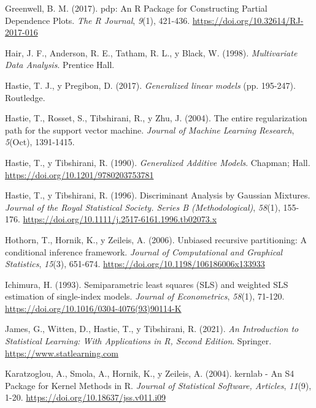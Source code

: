 \documentclass[
]{book}
\newlength{\cslhangindent}
\newlength{\cslentryspacingunit} %
\newenvironment{CSLReferences}[2] %
 {%
  \setlength{\parindent}{0pt}
  \ifodd #1
  \let\oldpar\par
  \def\par{\hangindent=\cslhangindent\oldpar}
  \fi
  \setlength{\parskip}{#2\cslentryspacingunit}
 }%
 {}
\theoremstyle{break}
\theoremstyle{nonumberplain}
\begin{document}
\begin{CSLReferences}{1}{0}
\leavevmode{}%
Greenwell, B. M. (2017). {pdp: An R Package for Constructing Partial Dependence Plots}. \emph{{The R Journal}}, \emph{9}(1), 421-436. \url{https://doi.org/10.32614/RJ-2017-016}

\leavevmode{}%
Hair, J. F., Anderson, R. E., Tatham, R. L., y Black, W. (1998). \emph{Multivariate Data Analysis}. Prentice Hall.

\leavevmode{}%
Hastie, T. J., y Pregibon, D. (2017). \emph{Generalized linear models} (pp. 195-247). Routledge.

\leavevmode{}%
Hastie, T., Rosset, S., Tibshirani, R., y Zhu, J. (2004). The entire regularization path for the support vector machine. \emph{Journal of Machine Learning Research}, \emph{5}(Oct), 1391-1415.

\leavevmode{}%
Hastie, T., y Tibshirani, R. (1990). \emph{Generalized Additive Models}. Chapman; Hall. \url{https://doi.org/10.1201/9780203753781}

\leavevmode{}%
Hastie, T., y Tibshirani, R. (1996). Discriminant Analysis by Gaussian Mixtures. \emph{Journal of the Royal Statistical Society. Series B (Methodological)}, \emph{58}(1), 155-176. \url{https://doi.org/10.1111/j.2517-6161.1996.tb02073.x}

\leavevmode{}%
Hothorn, T., Hornik, K., y Zeileis, A. (2006). Unbiased recursive partitioning: A conditional inference framework. \emph{Journal of Computational and Graphical Statistics}, \emph{15}(3), 651-674. \url{https://doi.org/10.1198/106186006x133933}

\leavevmode{}%
Ichimura, H. (1993). Semiparametric least squares (SLS) and weighted SLS estimation of single-index models. \emph{Journal of Econometrics}, \emph{58}(1), 71-120. \url{https://doi.org/10.1016/0304-4076(93)90114-K}

\leavevmode{}%
James, G., Witten, D., Hastie, T., y Tibshirani, R. (2021). \emph{An Introduction to Statistical Learning: With Applications in R, Second Edition}. Springer. \url{https://www.statlearning.com}

\leavevmode{}%
Karatzoglou, A., Smola, A., Hornik, K., y Zeileis, A. (2004). kernlab - An S4 Package for Kernel Methods in R. \emph{Journal of Statistical Software, Articles}, \emph{11}(9), 1-20. \url{https://doi.org/10.18637/jss.v011.i09}


\end{CSLReferences}
\end{document}
